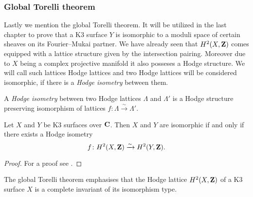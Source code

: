 \subsubsection*{Global Torelli theorem}

Lastly we mention the global Torelli theorem. It will be utilized in the last chapter to prove that a K3 surface $Y$ is isomorphic to a moduli space of certain sheaves on its Fourier--Mukai partner. We have already seen that $H^{2}(X, \mathbf Z)$ comes equipped with a lattice structure given by the intersection pairing. Moreover due to $X$ being a complex projective manifold it also posseses a Hodge structure. We will call such lattices Hodge lattices and two Hodge lattices will be considered isomorphic, if there is a \emph{Hodge isometry} between them. 

\begin{definition}

    A \emph{Hodge isometry} between two Hodge lattices $\Lambda$ and $\Lambda'$ is a Hodge structure preserving isomorphism of lattices $f \colon \Lambda \xrightarrow{\sim} \Lambda'$.
\end{definition}

\begin{theorem}
    \label{Classical Torelli theorem}
    Let $X$ and $Y$ be K3 surfaces over $\mathbf C$. Then $X$ and $Y$ are isomorphic if and only if there exists a Hodge isometry
    \[
        f\colon H^{2}(X, \mathbf Z) \xrightarrow{\sim} H^{2}(Y, \mathbf Z).
    \]
\end{theorem}

\begin{proof}
    For a proof see \cite[\S 7, Theorem 5.3]{Huybrechts2016}.
\end{proof}

\begin{remark}
    The global Torelli theorem emphasises that the Hodge lattice $H^{2}(X, \mathbf Z)$ of a K3 surface $X$ is a complete invariant of its isomorphism type. 
\end{remark}





